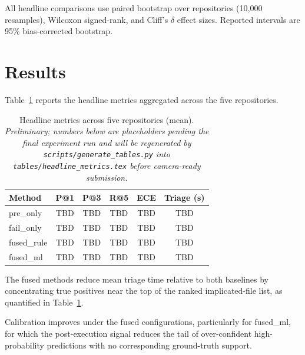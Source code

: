\documentclass[conference]{IEEEtran}
\begin{document}
All headline comparisons use paired bootstrap over repositories (10,000 resamples), Wilcoxon signed-rank, and Cliff's $\delta$ effect sizes. Reported intervals are 95\% bias-corrected bootstrap.

\section{Results}
\label{sec:evaluation}

Table~\ref{tab:headline} reports the headline metrics aggregated across the five repositories.

\begin{table}[t]
\centering
\caption{Headline metrics across five repositories (mean). \emph{Preliminary; numbers below are placeholders pending the final experiment run and will be regenerated by \texttt{scripts/generate\_tables.py} into \texttt{tables/headline\_metrics.tex} before camera-ready submission.}}
\label{tab:headline}
\begin{tabular}{lccccc}
\toprule
\textbf{Method} & \textbf{P@1} & \textbf{P@3} & \textbf{R@5} & \textbf{ECE} & \textbf{Triage (s)} \\
\midrule
pre\_only    & TBD & TBD & TBD & TBD & TBD \\
fail\_only   & TBD & TBD & TBD & TBD & TBD \\
fused\_rule  & TBD & TBD & TBD & TBD & TBD \\
fused\_ml    & TBD & TBD & TBD & TBD & TBD \\
\bottomrule
\end{tabular}
\end{table}



The fused methods reduce mean triage time relative to both baselines by concentrating true positives near the top of the ranked implicated-file list, as quantified in Table~\ref{tab:headline}.

Calibration improves under the fused configurations, particularly for fused\_ml, for which the post-execution signal reduces the tail of over-confident high-probability predictions with no corresponding ground-truth support.
\end{document}
